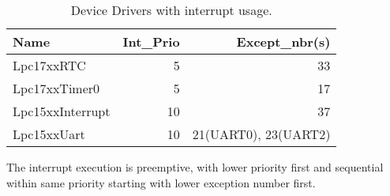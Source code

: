 \begin{table}
\begin{tabular}{|l|r|r|}
\hline
Name             & Int\_Prio & Except\_nbr(s) \\
\hline
Lpc17xxRTC       &  5 & 33 \\ 
Lpc17xxTimer0    &  5 &  17 \\
Lpc15xxInterrupt & 10 &  37 \\
Lpc15xxUart      & 10 &  21(UART0), 23(UART2) \\ 
\hline
\end{tabular}
\caption{Device Drivers with interrupt usage.}
\label{lpc17_device_list}
\end{table}

The interrupt execution is preemptive, with lower priority first and 
sequential within same priority starting with lower exception number first.



